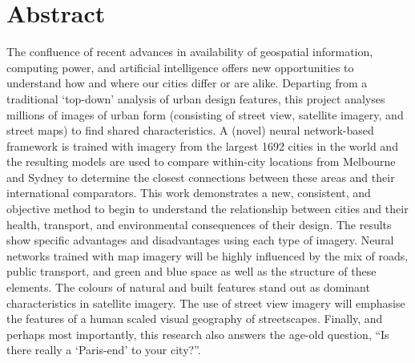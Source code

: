 \documentclass[10pt,letterpaper,hidelinks]{article}
\begin{document}
\section*{Abstract}
The confluence of recent advances in availability of geospatial information, computing power, and artificial intelligence offers new opportunities to understand how and where our cities differ or are alike. Departing from a traditional `top-down' analysis of urban design features, this project analyses millions of images of urban form (consisting of street view, satellite imagery, and street maps) to find shared characteristics. A (novel) neural network-based framework is trained with imagery from the largest 1692 cities in the world and the resulting models are used to compare within-city locations from Melbourne and Sydney to determine the closest connections between these areas and their international comparators. This work demonstrates a new, consistent, and objective method to begin to understand the relationship between cities and their health, transport, and environmental consequences of their design. The results show specific advantages and disadvantages using each type of imagery. Neural networks trained with map imagery will be highly influenced by the mix of roads, public transport, and green and blue space as well as the structure of these elements. The colours of natural and built features stand out as dominant characteristics in satellite imagery. The use of street view imagery will emphasise the features of a human scaled visual geography of streetscapes. Finally, and perhaps most importantly, this research also answers the age-old question, ``Is there really a `Paris-end' to your city?''.

\end{document}
